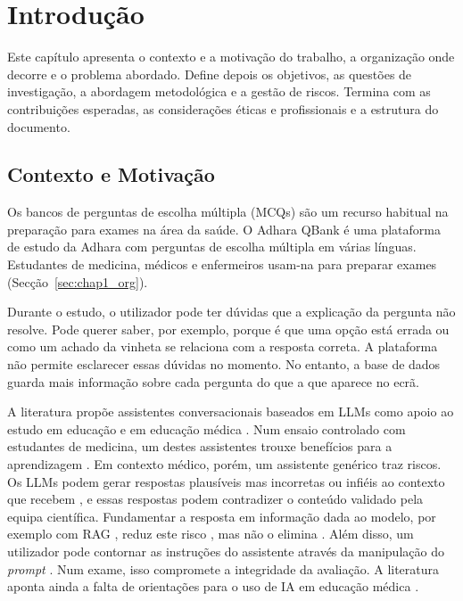 
\chapter{Introdução} %
\label{chap:Chapter1} %

Este capítulo apresenta o contexto e a motivação do trabalho, a organização onde decorre e o problema abordado. Define depois os objetivos, as questões de investigação, a abordagem metodológica e a gestão de riscos. Termina com as contribuições esperadas, as considerações éticas e profissionais e a estrutura do documento.

\section{Contexto e Motivação}
\label{sec:chap1_context}

Os bancos de perguntas de escolha múltipla (\glspl{MCQ}) são um recurso habitual na preparação para exames na área da saúde. O Adhara QBank é uma plataforma de estudo da Adhara com perguntas de escolha múltipla em várias línguas. Estudantes de medicina, médicos e enfermeiros usam-na para preparar exames (Secção~\ref{sec:chap1_org}).

Durante o estudo, o utilizador pode ter dúvidas que a explicação da pergunta não resolve. Pode querer saber, por exemplo, porque é que uma opção está errada ou como um achado da vinheta se relaciona com a resposta correta. A plataforma não permite esclarecer essas dúvidas no momento. No entanto, a base de dados guarda mais informação sobre cada pergunta do que a que aparece no ecrã.


A literatura propõe assistentes conversacionais baseados em \glspl{LLM} como apoio ao estudo em educação e em educação médica \parencite{kasneci2023chatgpt,abdalrazaq2023llm}. Num ensaio controlado com estudantes de medicina, um destes assistentes trouxe benefícios para a aprendizagem \parencite{gan2024orthopedic}. Em contexto médico, porém, um assistente genérico traz riscos. Os \glspl{LLM} podem gerar respostas plausíveis mas incorretas ou infiéis ao contexto que recebem \parencite{hu2025advancing,jain2025aligning}, e essas respostas podem contradizer o conteúdo validado pela equipa científica. Fundamentar a resposta em informação dada ao modelo, por exemplo com \gls{RAG} \parencite{hu2025advancing}, reduz este risco \parencite{jang2025medtutor}, mas não o elimina \parencite{xie2026when,rahat2026noise}. Além disso, um utilizador pode contornar as instruções do assistente através da manipulação do \emph{prompt} \parencite{emekci2025securing,geng2026prompt}. Num exame, isso compromete a integridade da avaliação. A literatura aponta ainda a falta de orientações para o uso de \gls{IA} em educação médica \parencite{gordon2024scoping}.

